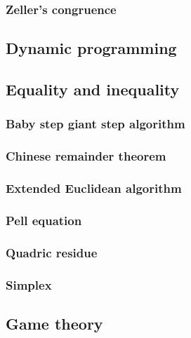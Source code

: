 \documentclass[titlepage,a4paper,10pt]{article}
\begin{document}
\begin{multicols}{2}
\begin{spacing}{0.8}
{				\subsubsection{Zeller’s congruence}
					
			\subsection{Dynamic programming}
				
			\subsection{Equality and inequality}
				\subsubsection{Baby step giant step algorithm}
					
				\subsubsection{Chinese remainder theorem}
					
				\subsubsection{Extended Euclidean algorithm}
					
				\subsubsection{Pell equation}
					
				\subsubsection{Quadric residue}
					
				\subsubsection{Simplex}
					
			\subsection{Game theory}
				
}
\end{spacing}
\end{multicols}
\end{document}
